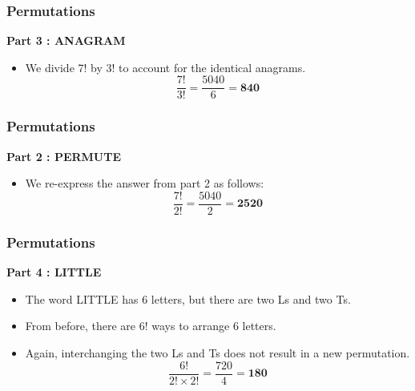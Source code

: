 \documentclass{beamer}
\begin{document}
\begin{frame}
\frametitle{Permutations}
\Large
\vspace{-0.1cm}
\textbf{Part 3 : ANAGRAM}\\
\begin{itemize}
\item We divide 7! by 3! to account for the identical anagrams.
\LARGE
\[\frac{7!}{3!} =  \frac{5040}{6} = \boldsymbol{840} \]
\end{itemize}
\end{frame}
\begin{frame}
\frametitle{Permutations}
\Large
\vspace{-2.3cm}
\textbf{Part 2 : PERMUTE}\\
\begin{itemize}
\item We re-express the answer from part 2 as follows:
\LARGE
\[\frac{7!}{2!} =  \frac{5040}{2} = \boldsymbol{2520} \]
\end{itemize}
\end{frame}
\begin{frame}
\frametitle{Permutations}
\Large
\vspace{-0.3cm}
\textbf{Part 4 : LITTLE}\\
\begin{itemize}
\item The word LITTLE has 6 letters, but there are two Ls and two Ts.
\item From before, there are 6! ways to arrange 6 letters.
\item Again, interchanging the two Ls and Ts does not result in a new permutation. 
\LARGE
\[\frac{6!}{2!\times 2!} =  \frac{720}{4} = \boldsymbol{180} \]
\end{itemize}
\end{frame}
\end{document}
